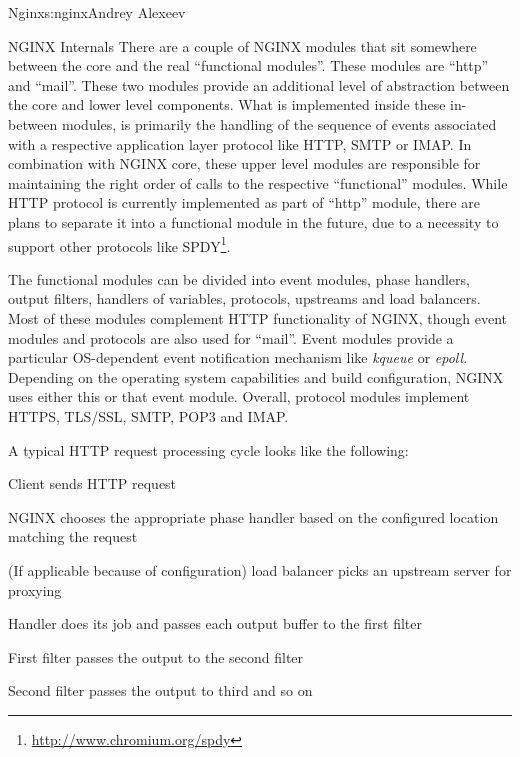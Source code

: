 \begin{aosachapter}{Nginx}{s:nginx}{Andrey Alexeev}
\begin{aosasect1}{NGINX Internals}
There are a couple of NGINX modules that sit somewhere between the
core and the real ``functional modules''. These modules are ``http''
and ``mail''. These two modules provide an additional level of
abstraction between the core and lower level components. What is
implemented inside these in-between modules, is primarily the handling
of the sequence of events associated with a respective application
layer protocol like HTTP, SMTP or IMAP. In combination with NGINX
core, these upper level modules are responsible for maintaining the
right order of calls to the respective ``functional'' modules. While
HTTP protocol is currently implemented as part of ``http'' module,
there are plans to separate it into a functional module in the future,
due to a necessity to support other protocols like
SPDY\footnote{\url{http://www.chromium.org/spdy}}.

The functional modules can be divided into event modules, phase
handlers, output filters, handlers of variables, protocols, upstreams
and load balancers. Most of these modules complement HTTP
functionality of NGINX, though event modules and protocols are also
used for ``mail''. Event modules provide a particular OS-dependent
event notification mechanism like \emph{kqueue} or \emph{epoll.}
Depending on the operating system capabilities and build
configuration, NGINX uses either this or that event module. Overall,
protocol modules implement HTTPS, TLS/SSL, SMTP, POP3 and IMAP.

A typical HTTP request processing cycle looks like the following:

\begin{aosaitemize}

\item Client sends HTTP request

\item NGINX chooses the appropriate phase handler based on the
configured location matching the request

\item (If applicable because of configuration) load balancer picks an
upstream server for proxying

\item Handler does its job and passes each output buffer to the first
filter

\item First filter passes the output to the second filter

\item Second filter passes the output to third and so on


\end{aosaitemize}
\end{aosasect1}
\end{aosachapter}
